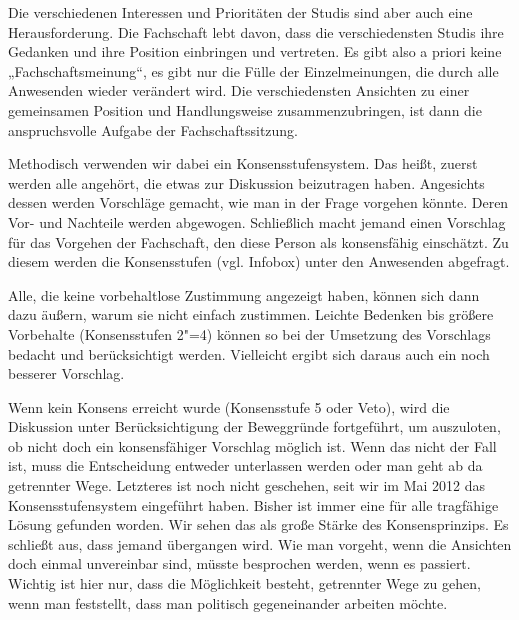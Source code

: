 
Die verschiedenen Interessen und Prioritäten der Studis sind aber auch eine Herausforderung. Die Fachschaft lebt davon, dass die verschiedensten Studis ihre Gedanken und ihre Position einbringen und vertreten. Es gibt also a priori keine „Fachschaftsmeinung“, es gibt nur die Fülle der Einzelmeinungen, die durch alle Anwesenden wieder verändert wird. Die verschiedensten Ansichten zu einer gemeinsamen Position und Handlungsweise zusammenzubringen, ist dann die anspruchsvolle Aufgabe der Fachschaftssitzung.

Methodisch verwenden wir dabei ein Konsensstufensystem. Das heißt, zuerst werden alle angehört, die etwas zur Diskussion beizutragen haben. Angesichts dessen werden Vorschläge gemacht, wie man in der Frage vorgehen könnte. Deren Vor- und Nachteile werden abgewogen. Schließlich macht jemand einen Vorschlag für das Vorgehen der Fachschaft, den diese Person als konsensfähig einschätzt. Zu diesem werden die Konsensstufen (vgl. Infobox) unter den Anwesenden abgefragt.

Alle, die keine vorbehaltlose Zustimmung angezeigt haben, können sich dann dazu äußern, warum sie nicht einfach zustimmen. Leichte Bedenken bis größere Vorbehalte (Konsensstufen 2"=4) können so bei der Umsetzung des Vorschlags bedacht und berücksichtigt werden. Vielleicht ergibt sich daraus auch ein noch besserer Vorschlag.

Wenn kein Konsens erreicht wurde (Konsensstufe 5 oder Veto), wird die Diskussion unter Berücksichtigung der Beweggründe fortgeführt, um auszuloten, ob nicht doch ein konsensfähiger Vorschlag möglich ist. Wenn das nicht der Fall ist, muss die Entscheidung entweder unterlassen werden oder man geht ab da getrennter Wege. Letzteres ist noch nicht geschehen, seit wir im Mai 2012 das Konsensstufensystem eingeführt haben.
Bisher ist immer eine für alle tragfähige Lösung gefunden worden. Wir sehen das als große Stärke des Konsensprinzips. Es schließt aus, dass jemand übergangen wird. Wie man vorgeht, wenn die Ansichten doch einmal unvereinbar sind, müsste besprochen werden, wenn es passiert. Wichtig ist hier nur, dass die Möglichkeit besteht, getrennter Wege zu gehen, wenn man feststellt, dass man politisch gegeneinander arbeiten möchte.


\begin{figure*}[b]
\noindent{}
\end{figure*}

